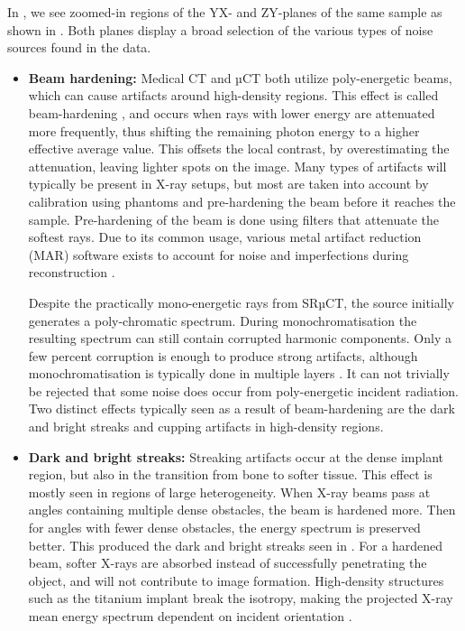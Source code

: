 In , we see zoomed-in regions of the YX- and ZY-planes of the
same sample as shown in . Both planes display a broad
selection of the various types of noise sources found in the data.
\begin{itemize}
  \item \textbf{Beam hardening:} Medical CT and µCT both utilize poly-energetic
      beams, which can cause artifacts around high-density regions. This effect
        is called beam-hardening \citep{beam-hardening}, and occurs when rays
        with lower energy are attenuated more frequently, thus shifting the
        remaining photon energy to a higher effective average value. This
        offsets the local contrast, by overestimating the attenuation, leaving
        lighter spots on the image. Many types of artifacts will typically be
        present in X-ray setups, but most are taken into account by calibration
        using phantoms and pre-hardening the beam before it reaches the sample.
        Pre-hardening of the beam is done using filters that attenuate the
        softest rays. Due to its common usage, various metal artifact reduction
        (MAR) software exists to account for noise and imperfections during
        reconstruction \citep{mar1}\citep{mar2}.

    Despite the practically mono-energetic rays from SRµCT, the source
        initially generates a poly-chromatic spectrum. During
        monochromatisation the resulting spectrum can still contain corrupted
        harmonic components. Only a few percent corruption is enough to produce
        strong artifacts, although monochromatisation is typically done in
        multiple layers \citep{srnoise}. It can not trivially be rejected that
        some noise does occur from poly-energetic incident radiation. Two
        distinct effects typically seen as a result of beam-hardening are the
        dark and bright streaks and cupping artifacts in high-density regions.

  \item \textbf{Dark and bright streaks:} Streaking artifacts occur at the dense
    implant region, but also in the transition from bone to softer tissue. This
        effect is mostly seen in regions of large heterogeneity. When X-ray
        beams pass at angles containing multiple dense obstacles, the beam is
        hardened more. Then for angles with fewer dense obstacles, the energy
        spectrum is preserved better. This produced the dark and bright streaks
        seen in .
        For a hardened beam, softer X-rays are absorbed instead of successfully
        penetrating the object, and will not contribute to image formation.
        High-density structures such as the titanium implant break the
        isotropy, making the projected X-ray mean energy spectrum dependent on
        incident orientation \citep{srnoise}.


\end{itemize}
